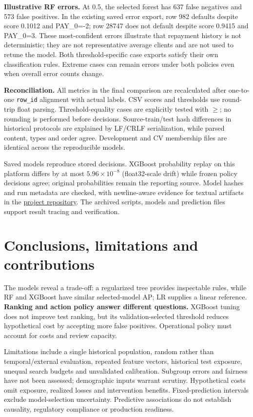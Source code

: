 \documentclass{article}
\begin{document}
\textbf{Illustrative RF errors.} At 0.5, the selected forest has 637 false negatives and 573 false positives. In the existing saved error export, row 982 defaults despite score 0.1012 and PAY\_0=-2; row 28747 does not default despite score 0.9415 and PAY\_0=3. These most-confident errors illustrate that repayment history is not deterministic; they are not representative average clients and are not used to retune the model. Both threshold-specific case exports satisfy their own classification rules. Extreme cases can remain errors under both policies even when overall error counts change.

\textbf{Reconciliation.} All metrics in the final comparison are recalculated after one-to-one \texttt{row\_id} alignment with actual labels. CSV scores and thresholds use round-trip float parsing. Threshold-equality cases are explicitly tested with $\geq$; no rounding is performed before decisions. Source-train/test hash differences in historical protocols are explained by LF/CRLF serialization, while parsed content, types and order agree. Development and CV membership files are identical across the reproducible models.

Saved models reproduce stored decisions. XGBoost probability replay on this platform differs by at most $5.96\times10^{-8}$ (float32-scale drift) while frozen policy decisions agree; original probabilities remain the reporting source. Model hashes and run metadata are checked, with newline-aware evidence for textual artifacts in the \href{https://github.com/IcantFind-a-username/-SC6122-Group5-Credit-Default}{project repository}. The archived scripts, models and prediction files support result tracing and verification.
\newpage
\section{Conclusions, limitations and contributions}
The models reveal a trade-off: a regularized tree provides inspectable rules, while RF and XGBoost have similar selected-model AP; LR supplies a linear reference. \textbf{Ranking and action policy answer different questions.} XGBoost tuning does not improve test ranking, but its validation-selected threshold reduces hypothetical cost by accepting more false positives. Operational policy must account for costs and review capacity.

Limitations include a single historical population, random rather than temporal/external evaluation, repeated feature vectors, historical test exposure, unequal search budgets and unvalidated calibration. Subgroup errors and fairness have not been assessed; demographic inputs warrant scrutiny. Hypothetical costs omit exposure, realized losses and intervention benefits. Fixed-prediction intervals exclude model-selection uncertainty. Predictive associations do not establish causality, regulatory compliance or production readiness.
\end{document}
